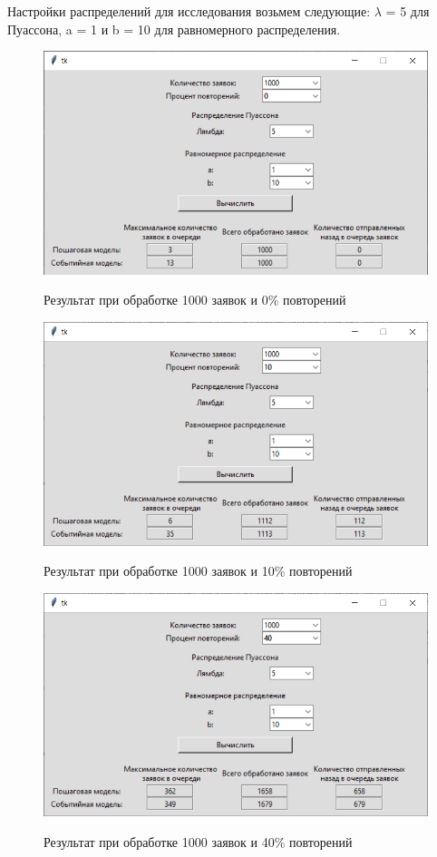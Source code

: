 \documentclass[12pt,a4paper,oneside]{report}
\begin{document}
Настройки распределений для исследования возьмем следующие: $\lambda$ = 5 для Пуассона, a = 1 и b = 10 для равномерного распределения.\\

\begin{figure}[!h]
	\centering
	\includegraphics[scale=0.7]{1_1.png}
	\label{fig:screenshot001}
	\caption{Результат при обработке 1000 заявок и 0\% повторений}
\end{figure}
\clearpage

\begin{figure}[!h]
	\centering
	\includegraphics[scale=0.7]{1_2.png}
	\label{fig:screenshot002}
	\caption{Результат при обработке 1000 заявок и 10\% повторений}
\end{figure}

\begin{figure}[!h]
	\centering
	\includegraphics[scale=0.7]{1_3.png}
	\label{fig:screenshot003}
	\caption{Результат при обработке 1000 заявок и 40\% повторений}
\end{figure}
\end{document}
